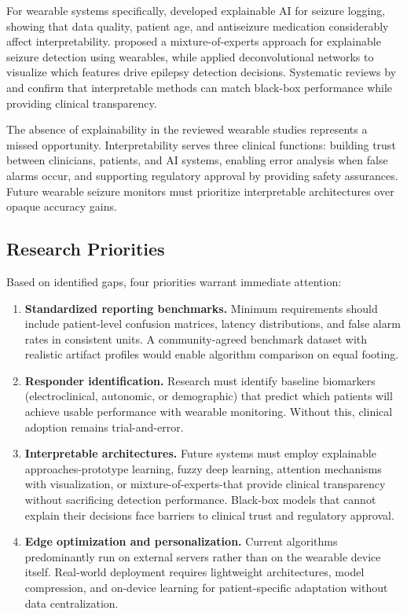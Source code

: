 For wearable systems specifically, \parencite{halimehExplainableAIWearable2023} developed explainable AI for seizure logging, showing that data quality, patient age, and antiseizure medication considerably affect interpretability. \parencite{germinoMixtureCheckpointExperts2025} proposed a mixture-of-experts approach for explainable seizure detection using wearables, while \parencite{shaoApplicationDeconvolutionalNetworks2025} applied deconvolutional networks to visualize which features drive epilepsy detection decisions. Systematic reviews by \parencite{gurmessaComprehensiveEvaluationInterpretable2025} and \parencite{zhaoEpilepticSeizureDetection2023} confirm that interpretable methods can match black-box performance while providing clinical transparency.

The absence of explainability in the reviewed wearable studies represents a missed opportunity. Interpretability serves three clinical functions: building trust between clinicians, patients, and AI systems, enabling error analysis when false alarms occur, and supporting regulatory approval by providing safety assurances. Future wearable seizure monitors must prioritize interpretable architectures over opaque accuracy gains.

\subsection{Research Priorities}

Based on identified gaps, four priorities warrant immediate attention:

\begin{enumerate}
  \item \textbf{Standardized reporting benchmarks.} Minimum requirements should include patient-level confusion matrices, latency distributions, and false alarm rates in consistent units. A community-agreed benchmark dataset with realistic artifact profiles would enable algorithm comparison on equal footing.

  \item \textbf{Responder identification.} Research must identify baseline biomarkers (electroclinical, autonomic, or demographic) that predict which patients will achieve usable performance with wearable monitoring. Without this, clinical adoption remains trial-and-error.

  \item \textbf{Interpretable architectures.} Future systems must employ explainable approaches-prototype learning, fuzzy deep learning, attention mechanisms with visualization, or mixture-of-experts-that provide clinical transparency without sacrificing detection performance. Black-box models that cannot explain their decisions face barriers to clinical trust and regulatory approval.

  \item \textbf{Edge optimization and personalization.} Current algorithms predominantly run on external servers rather than on the wearable device itself. Real-world deployment requires lightweight architectures, model compression, and on-device learning for patient-specific adaptation without data centralization.
\end{enumerate}

